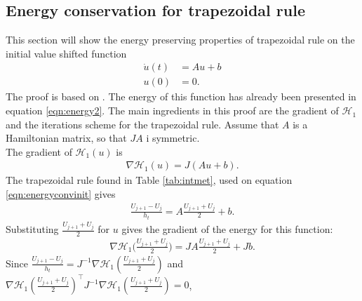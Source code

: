 \subsection{Energy conservation for trapezoidal rule} %
This section will show the energy preserving properties of trapezoidal rule on the initial value shifted function
\begin{equation}
\begin{aligned}
\dot{u}(t)& = Au + b \\
u(0)& = 0.
\end{aligned}
\label{eqn:energyconvinit}
\end{equation}
\noindent The proof is based on \cite{convtrap}.
The energy of this function has already been presented in equation \eqref{eqn:energy2}. The main ingredients in this proof are the gradient of $\mathcal{H}_1$ and the iterations scheme for the trapezoidal rule. Assume that $A$ is a Hamiltonian matrix, so that $JA$ i symmetric.\\ 
The gradient of $\mathcal{H}_1(u)$ is 
\begin{equation*}
\begin{aligned}
\nabla \mathcal{H}_1(u) = J (Au + b) .
\end{aligned}
\end{equation*}
\noindent The trapezoidal rule found in Table \ref{tab:intmet}, used on equation \eqref{eqn:energyconvinit} gives 
\begin{equation*}
\begin{aligned}
\frac{U_{j+1} - U_j}{h_t} = A \frac{U_{j+1}  + U_j}{2} + b.
\end{aligned}
\end{equation*}
\noindent Substituting $\frac{U_{j+1}  + U_j}{2} $ for $u$ gives the gradient of the energy for this function:
\begin{equation*}
\begin{aligned}
\nabla \mathcal{H}_1 \Big(\frac{U_{j+1}  + U_j}{2}\Big) = JA \frac{U_{j+1}  + U_j}{2} + J b.
\end{aligned}
\end{equation*}
\noindent Since
$\frac{ U_{j+1} - U_j}{h_t} = J^{-1} \nabla \mathcal{H}_1( \frac{U_{j+1}  + U_j}{2} ) $
\noindent and
$\nabla \mathcal{H}_1(\frac{U_{j+1}  + U_j}{2})^\top J^{-1} \nabla \mathcal{H}_1(\frac{U_{j+1}  + U_j}{2}) = 0$,
